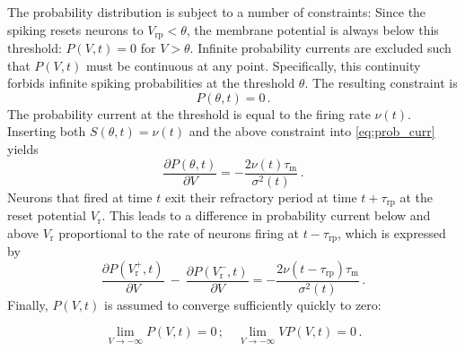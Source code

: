 The probability distribution is subject to a number of 
constraints: Since the spiking resets neurons to $V_\text{rp} < \theta$, 
the membrane potential is always below this threshold:
$P(V, t) = 0$ for $V > \theta$. Infinite probability currents are excluded 
such that $P(V, t)$ must be continuous at any point. Specifically, 
this continuity forbids infinite spiking probabilities at the threshold $\theta$. 
The resulting constraint is 
\begin{equation}
    P(\theta, t) = 0 \,.
    \label{eq:continuity} 
\end{equation}
The probability current at the threshold is equal to the firing rate
$\nu(t)$. Inserting both $S(\theta, t) = \nu(t)$ and the above constraint into 
\autoref{eq:prob_curr} yields
\begin{equation}
    \frac{\partial P(\theta, t)}{\partial V}    
        = - \frac{2 \nu(t) \tau_\text{m}}{\sigma^2(t)}  \,.
\end{equation}
Neurons that fired at time $t$ exit their refractory period at 
time $t + \tau_\text{rp}$ at the reset potential $V_\text{r}$. This leads to
a difference in probability current below and above $V_\text{r}$ proportional to 
the rate of neurons firing at $t - \tau_\text{rp}$, which is expressed by
\begin{equation}
    \frac{\partial P(V_\text{r}^+, t)}{\partial V} \: -  \: \frac{\partial P(V_\text{r}^-, t)}{\partial V} 
        = - \frac{2 \nu(t - \tau_\text{rp}) \tau_\text{m}}{\sigma^2(t)} \,.
\end{equation}
Finally, $P(V, t)$ is assumed to converge sufficiently quickly to zero:

\begin{equation}
\lim_{V \to -\infty} P(V, t) = 0 \, ;
    \quad 
    \lim_{V \to -\infty} V P(V, t) = 0 \,.
\end{equation}

